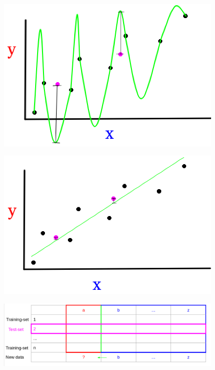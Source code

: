 \documentclass{beamer}
\begin{document}
\begin{frame}
\begin{figure}[ht!]
 \centering
 \includegraphics[scale=0.3]{f2.png}
\end{figure}
\end{frame}

\begin{frame}
\begin{figure}[ht!]
 \centering
 \includegraphics[scale=0.3]{f3.png}
\end{figure}
\end{frame}

\begin{frame}
 \begin{figure}[ht!]
 \centering
 \includegraphics[scale=0.28]{table4.png}
\end{figure}
\end{frame}
\end{document}
